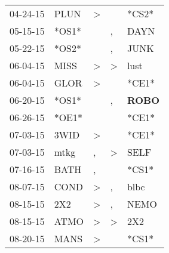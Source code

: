 \begin{supertabular}{p{0.07\textwidth}p{0.06\textwidth}p{0.02\textwidth}p{0.02\textwidth}p{0.06\textwidth}}
          04-24-15\textsuperscript{} &           PLUN\textsuperscript{} &     \textgreater &                  &                            *CS2* \\
          05-15-15\textsuperscript{} &                            *OS1* &                  &                , &           DAYN\textsuperscript{} \\
          05-22-15\textsuperscript{} &                            *OS2* &                  &                , &           JUNK\textsuperscript{} \\
          06-04-15\textsuperscript{} &           MISS\textsuperscript{} &     \textgreater &     \textgreater &           lust\textsuperscript{} \\
          06-04-15\textsuperscript{} &           GLOR\textsuperscript{} &     \textgreater &                  &                            *CE1* \\
          06-20-15\textsuperscript{} &                            *OS1* &                  &                , &  \textbf{ROBO\textsuperscript{}} \\
          06-26-15\textsuperscript{} &                            *OE1* &                  &                  &                            *CE1* \\
          07-03-15\textsuperscript{} &           3WID\textsuperscript{} &     \textgreater &                  &                            *CE1* \\
          07-03-15\textsuperscript{} &           mtkg\textsuperscript{} &                , &     \textgreater &           SELF\textsuperscript{} \\
          07-16-15\textsuperscript{} &           BATH\textsuperscript{} &                , &                  &                            *CS1* \\
          08-07-15\textsuperscript{} &           COND\textsuperscript{} &     \textgreater &                , &           blbc\textsuperscript{} \\
          08-15-15\textsuperscript{} &            2X2\textsuperscript{} &     \textgreater &                , &           NEMO\textsuperscript{} \\
          08-15-15\textsuperscript{} &           ATMO\textsuperscript{} &     \textgreater &     \textgreater &            2X2\textsuperscript{} \\
          08-20-15\textsuperscript{} &           MANS\textsuperscript{} &     \textgreater &                  &                            *CS1* \\

\end{supertabular}
